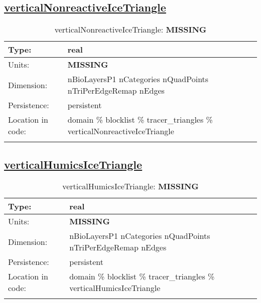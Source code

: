 \subsection[verticalNonreactiveIceTriangle]{\hyperref[sec:var_tab_tracer_triangles]{verticalNonreactiveIceTriangle}}
\label{subsec:var_sec_tracer_triangles_verticalNonreactiveIceTriangle}
\begin{center}
\begin{longtable}{| p{2.0in} | p{4.0in} |}
        \hline 
        Type: & real \\
        \hline 
        Units: & {\bf \color{red} MISSING} \\
        \hline 
        Dimension: & nBioLayersP1 nCategories nQuadPoints nTriPerEdgeRemap nEdges \\
        \hline 
        Persistence: & persistent \\
        \hline 
         Location in code: & domain \% blocklist \% tracer\_triangles \% verticalNonreactiveIceTriangle \\
         \hline 
    \caption{verticalNonreactiveIceTriangle: {\bf \color{red} MISSING}}
\end{longtable}
\end{center}
\subsection[verticalHumicsIceTriangle]{\hyperref[sec:var_tab_tracer_triangles]{verticalHumicsIceTriangle}}
\label{subsec:var_sec_tracer_triangles_verticalHumicsIceTriangle}
\begin{center}
\begin{longtable}{| p{2.0in} | p{4.0in} |}
        \hline 
        Type: & real \\
        \hline 
        Units: & {\bf \color{red} MISSING} \\
        \hline 
        Dimension: & nBioLayersP1 nCategories nQuadPoints nTriPerEdgeRemap nEdges \\
        \hline 
        Persistence: & persistent \\
        \hline 
         Location in code: & domain \% blocklist \% tracer\_triangles \% verticalHumicsIceTriangle \\
         \hline 
    \caption{verticalHumicsIceTriangle: {\bf \color{red} MISSING}}
\end{longtable}
\end{center}
